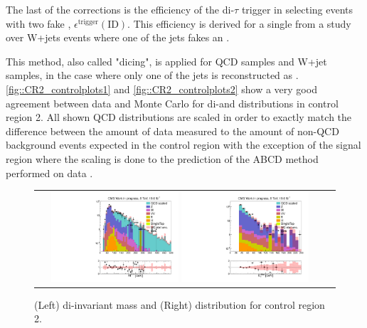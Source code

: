 The last of the corrections is the efficiency of the di-$\tau$ trigger in selecting events with two fake \hadtau , $\epsilon^{\text{trigger}}(\text{ID})$. This efficiency is derived for a single \hadtaufake from a study over W+jets events where one of the jets fakes an \hadtau.

This method, also called "dicing", is applied for QCD samples and W+jet samples, in the case where only one of the jets is reconstructed as \hadtaufake. 	\autoref{fig::CR2_controlplots1} and \autoref{fig::CR2_controlplots2} show a very good agreement between data and Monte Carlo for di-\hadtau and \met distributions in control region 2. All shown QCD distributions are scaled in order to exactly match the difference between the amount of data measured to the amount of non-QCD background events expected in the control region with the exception of the signal region where the scaling is done to the prediction of the ABCD method performed on data \cite{bib:phdthesis:denis}.


\begin{figure}[tbh!]
	\centering
	\begin{tabular}{cc}
		\includegraphics[width=0.45\textwidth]{PLOTS/diTauHadLSQCDPlots/AllMCdiced/OS_CR2/OS_Central_invertedVBF_2TightIso_CR2/h_ditauinvariantmass_log.pdf}
		\includegraphics[width=0.45\textwidth]{PLOTS/diTauHadLSQCDPlots/AllMCdiced/OS_CR2/OS_Central_invertedVBF_2TightIso_CR2/h_met_log.pdf} 		
	\end{tabular}
	\caption{(Left) di-\hadtau invariant mass and (Right) \met distribution for control region 2.}
	\label{fig::CR2_controlplots1}
\end{figure}

